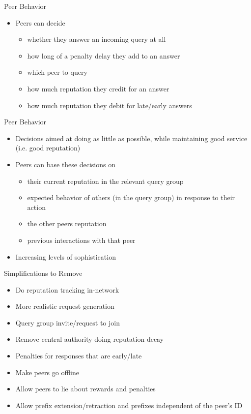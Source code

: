 \documentclass[presentation,english,usenames,dvipsnames]{beamer}
\begin{document}
\begin{frame}{Peer Behavior}
  \begin{itemize}
    \item Peers can decide
    \begin{itemize}
      \item whether they answer an incoming query at all
      \item how long of a penalty delay they add to an answer
      \item which peer to query
      \item how much reputation they credit for an answer
      \item how much reputation they debit for late/early answers
    \end{itemize}
  \end{itemize}
\end{frame}

\begin{frame}{Peer Behavior}
  \begin{itemize}
    \item Decisions aimed at doing as little as possible, while maintaining good
          service (i.e. good reputation)
    \item Peers can base these decisions on
    \begin{itemize}
      \item their current reputation in the relevant query group
      \item expected behavior of others (in the query group) in response to
            their action
      \item the other peers reputation
      \item previous interactions with that peer
    \end{itemize}
    \item Increasing levels of sophistication
  \end{itemize}
\end{frame}

\begin{frame}{Simplifications to Remove}
  \begin{itemize}
    \item Do reputation tracking in-network
    \item More realistic request generation
    \item Query group invite/request to join
    \item Remove central authority doing reputation decay
    \item Penalties for responses that are early/late
    \item Make peers go offline
    \item Allow peers to lie about rewards and penalties
    \item Allow prefix extension/retraction and prefixes independent of the
          peer's ID
  \end{itemize}
\end{frame}
\end{document}
